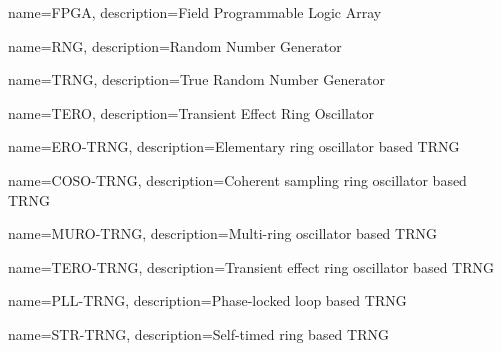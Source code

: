 {
    name=FPGA,
    description={Field Programmable Logic Array}
}

{
    name=RNG,
    description={Random Number Generator}
}

{
    name=TRNG,
    description={True Random Number Generator}
}

{
    name=TERO,
    description={Transient Effect Ring Oscillator}
}

{
    name=ERO-TRNG,
    description={Elementary ring oscillator based TRNG}
}

{
    name=COSO-TRNG,
    description={Coherent sampling ring oscillator based TRNG}
}

{
    name=MURO-TRNG,
    description={Multi-ring oscillator based TRNG}
}


{
    name=TERO-TRNG,
    description={Transient effect ring oscillator based TRNG}
}

{
    name=PLL-TRNG,
    description={Phase-locked loop based TRNG}
}


{
    name=STR-TRNG,
    description={Self-timed ring based TRNG}
}